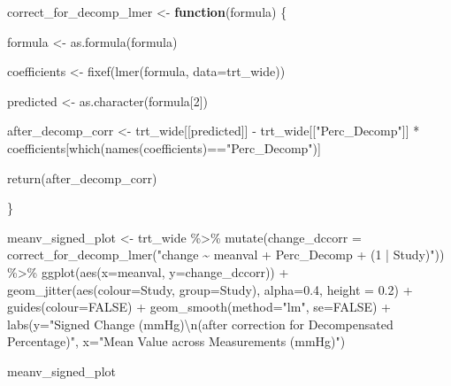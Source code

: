 \documentclass[
]{article}
\newenvironment{Shaded}{\begin{snugshade}}{\end{snugshade}}
\newcommand{\AttributeTok}[1]{\textcolor[rgb]{0.77,0.63,0.00}{#1}}
\newcommand{\ConstantTok}[1]{\textcolor[rgb]{0.00,0.00,0.00}{#1}}
\newcommand{\ControlFlowTok}[1]{\textcolor[rgb]{0.13,0.29,0.53}{\textbf{#1}}}
\newcommand{\DecValTok}[1]{\textcolor[rgb]{0.00,0.00,0.81}{#1}}
\newcommand{\FloatTok}[1]{\textcolor[rgb]{0.00,0.00,0.81}{#1}}
\newcommand{\FunctionTok}[1]{\textcolor[rgb]{0.00,0.00,0.00}{#1}}
\newcommand{\NormalTok}[1]{#1}
\newcommand{\OtherTok}[1]{\textcolor[rgb]{0.56,0.35,0.01}{#1}}
\newcommand{\SpecialCharTok}[1]{\textcolor[rgb]{0.00,0.00,0.00}{#1}}
\newcommand{\StringTok}[1]{\textcolor[rgb]{0.31,0.60,0.02}{#1}}
\begin{document}
\begin{Shaded}
\begin{Highlighting}[]
\NormalTok{correct\_for\_decomp\_lmer }\OtherTok{\textless{}{-}} \ControlFlowTok{function}\NormalTok{(formula) \{}
  
\NormalTok{  formula }\OtherTok{\textless{}{-}} \FunctionTok{as.formula}\NormalTok{(formula)}
  
\NormalTok{  coefficients }\OtherTok{\textless{}{-}} \FunctionTok{fixef}\NormalTok{(}\FunctionTok{lmer}\NormalTok{(formula, }\AttributeTok{data=}\NormalTok{trt\_wide))}

\NormalTok{  predicted }\OtherTok{\textless{}{-}} \FunctionTok{as.character}\NormalTok{(formula[}\DecValTok{2}\NormalTok{])}
  
\NormalTok{  after\_decomp\_corr }\OtherTok{\textless{}{-}}\NormalTok{ trt\_wide[[predicted]] }\SpecialCharTok{{-}} 
\NormalTok{    trt\_wide[[}\StringTok{"Perc\_Decomp"}\NormalTok{]] }\SpecialCharTok{*}\NormalTok{ coefficients[}\FunctionTok{which}\NormalTok{(}\FunctionTok{names}\NormalTok{(coefficients)}\SpecialCharTok{==}\StringTok{"Perc\_Decomp"}\NormalTok{)]}
  
  \FunctionTok{return}\NormalTok{(after\_decomp\_corr)}
  
\NormalTok{\}}


\NormalTok{meanv\_signed\_plot }\OtherTok{\textless{}{-}}\NormalTok{ trt\_wide }\SpecialCharTok{\%\textgreater{}\%} 
  \FunctionTok{mutate}\NormalTok{(}\AttributeTok{change\_dccorr =} \FunctionTok{correct\_for\_decomp\_lmer}\NormalTok{(}\StringTok{"change \textasciitilde{} meanval + Perc\_Decomp + (1 | Study)"}\NormalTok{)) }\SpecialCharTok{\%\textgreater{}\%} 
  \FunctionTok{ggplot}\NormalTok{(}\FunctionTok{aes}\NormalTok{(}\AttributeTok{x=}\NormalTok{meanval, }\AttributeTok{y=}\NormalTok{change\_dccorr)) }\SpecialCharTok{+}
  \FunctionTok{geom\_jitter}\NormalTok{(}\FunctionTok{aes}\NormalTok{(}\AttributeTok{colour=}\NormalTok{Study, }\AttributeTok{group=}\NormalTok{Study), }\AttributeTok{alpha=}\FloatTok{0.4}\NormalTok{, }\AttributeTok{height =} \FloatTok{0.2}\NormalTok{) }\SpecialCharTok{+}
  \FunctionTok{guides}\NormalTok{(}\AttributeTok{colour=}\ConstantTok{FALSE}\NormalTok{) }\SpecialCharTok{+} 
  \FunctionTok{geom\_smooth}\NormalTok{(}\AttributeTok{method=}\StringTok{"lm"}\NormalTok{, }\AttributeTok{se=}\ConstantTok{FALSE}\NormalTok{) }\SpecialCharTok{+}
  \FunctionTok{labs}\NormalTok{(}\AttributeTok{y=}\StringTok{"Signed Change (mmHg)}\SpecialCharTok{\textbackslash{}n}\StringTok{(after correction for Decompensated Percentage)"}\NormalTok{,}
       \AttributeTok{x=}\StringTok{"Mean Value across Measurements (mmHg)"}\NormalTok{)}

\NormalTok{meanv\_signed\_plot}
\end{Highlighting}
\end{Shaded}
\end{document}
